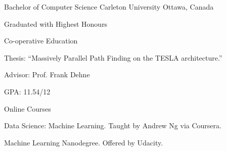 


\begin{cventries}


\cventry
{Bachelor of Computer Science} %
{Carleton University} %
{Ottawa, Canada} %
{} %
{ %
\begin{cvitems}
  \item {Graduated with Highest Honours}
  \item {Co-operative Education}
  \item {Thesis: ``Massively Parallel Path Finding on the TESLA architecture.''}
  \item {Advisor: Prof. Frank Dehne}
  \item {GPA: 11.54/12}
\end{cvitems}
}


\cventry
{} %
{Online Courses} %
{} %
{} %
{ %
\begin{cvitems}
  \item {Data Science: Machine Learning. Taught by Andrew Ng via Coursera.}
  \item {Machine Learning Nanodegree. Offered by Udacity.}
\end{cvitems}
}

\end{cventries}